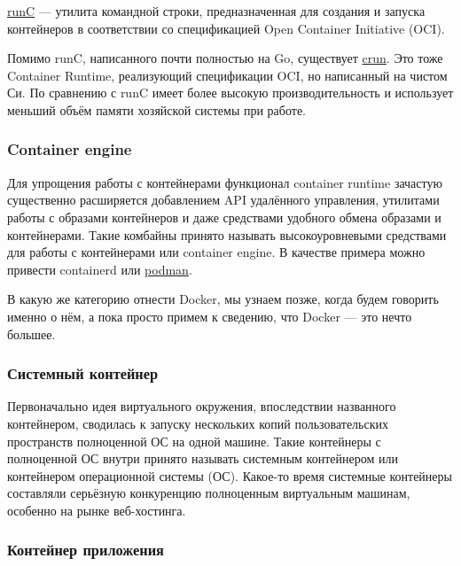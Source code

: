 \documentclass[14pt, a4paper]{article}
\begin{document}
\href{https://github.com/opencontainers/runc}{runC} — утилита командной строки, предназначенная для создания и запуска контейнеров в
соответствии со спецификацией Open Container Initiative (OCI).

Помимо runC, написанного почти полностью на Go, существует \href{https://github.com/containers/crun}{crun}. Это тоже Container Runtime,
реализующий спецификации OCI, но написанный на чистом Си. По сравнению с runC имеет более
высокую производительность и использует меньший объём памяти хозяйской системы при работе.\\


\subsubsection*{Container engine}

Для упрощения работы с контейнерами функционал container runtime зачастую существенно
расширяется добавлением API удалённого управления, утилитами работы с образами контейнеров и
даже средствами удобного обмена образами и контейнерами. Такие комбайны принято называть
высокоуровневыми средствами для работы с контейнерами или container engine. В качестве примера
можно привести containerd или \href{https://podman.io/}{podman}.

В какую же категорию отнести Docker, мы узнаем позже, когда будем говорить именно о нём, а пока
просто примем к сведению, что Docker — это нечто большее.\\


\subsubsection*{Системный контейнер}


Первоначально идея виртуального окружения, впоследствии названного контейнером, сводилась к
запуску нескольких копий пользовательских пространств полноценной ОС на одной машине. Такие
контейнеры с полноценной ОС внутри принято называть системным контейнером или контейнером
операционной системы (ОС). Какое-то время системные контейнеры составляли серьёзную
конкуренцию полноценным виртуальным машинам, особенно на рынке веб-хостинга.\\


\subsubsection*{Контейнер приложения}
\end{document}
